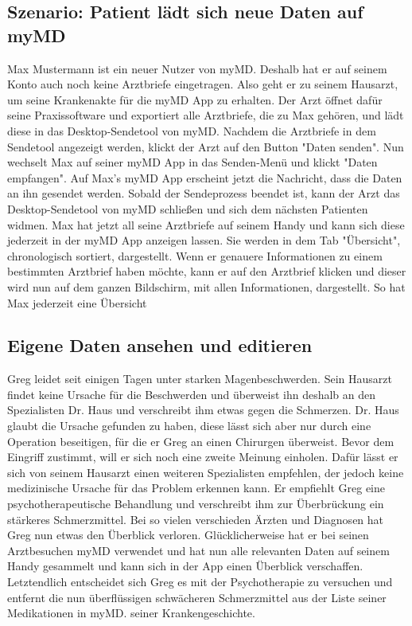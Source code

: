 \documentclass[a4paper]{scrreprt}
\begin{document}
\subsection{Szenario: Patient lädt sich neue Daten auf myMD}
Max Mustermann ist ein neuer Nutzer von myMD. Deshalb hat er auf seinem Konto auch noch keine Arztbriefe eingetragen. Also geht er zu seinem Hausarzt, um seine Krankenakte für die myMD \gls{App} zu erhalten. Der Arzt öffnet dafür seine Praxissoftware und exportiert alle Arztbriefe, die zu Max gehören, und lädt diese in das Desktop-Sendetool von myMD. Nachdem die Arztbriefe in dem Sendetool angezeigt werden, klickt der Arzt auf den Button "Daten senden". Nun wechselt Max auf seiner myMD \gls{App} in das Senden-Menü und klickt "Daten empfangen". Auf Max's myMD \gls{App} erscheint jetzt die Nachricht, dass die Daten an ihn gesendet werden. Sobald der Sendeprozess beendet ist, kann der Arzt das Desktop-Sendetool von myMD schließen und sich dem nächsten Patienten widmen. Max hat jetzt all seine Arztbriefe auf seinem Handy und kann sich diese jederzeit in der myMD \gls{App} anzeigen lassen. Sie werden in dem Tab "Übersicht", chronologisch sortiert, dargestellt. Wenn er genauere Informationen zu einem bestimmten Arztbrief haben möchte, kann er auf den Arztbrief klicken und dieser wird nun auf dem ganzen Bildschirm, mit allen Informationen, dargestellt. So hat Max jederzeit eine Übersicht

\subsection{Eigene Daten ansehen und editieren}
Greg leidet seit einigen Tagen unter starken Magenbeschwerden. Sein Hausarzt findet keine Ursache für die Beschwerden und überweist ihn deshalb an den Spezialisten Dr. Haus und verschreibt ihm etwas gegen die Schmerzen. Dr. Haus glaubt die Ursache gefunden zu haben, diese lässt sich aber nur durch eine Operation beseitigen, für die er Greg an einen Chirurgen überweist. Bevor dem Eingriff zustimmt, will er sich noch eine zweite Meinung einholen. Dafür lässt er sich von seinem Hausarzt einen weiteren Spezialisten empfehlen, der jedoch keine medizinische Ursache für das Problem erkennen kann. Er empfiehlt Greg eine psychotherapeutische Behandlung und verschreibt ihm zur Überbrückung ein stärkeres Schmerzmittel. Bei so vielen verschieden Ärzten und Diagnosen hat Greg nun etwas den Überblick verloren. Glücklicherweise hat er bei seinen Arztbesuchen myMD verwendet und hat nun alle relevanten Daten auf seinem Handy gesammelt und kann sich in der App einen Überblick verschaffen. Letztendlich entscheidet sich Greg es mit der Psychotherapie zu versuchen und entfernt die nun überflüssigen schwächeren Schmerzmittel aus der Liste seiner Medikationen in myMD. seiner Krankengeschichte.
\end{document}
